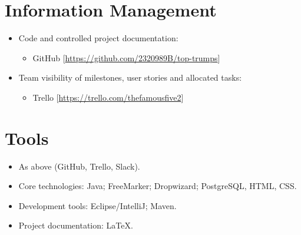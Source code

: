\documentclass[a4paper, 12pt, titlepage]{article}
\begin{document}
	\section{Information Management}
	\begin{itemize}
		\item Code and controlled project documentation:
		\begin{itemize}
			\item GitHub [\url{https://github.com/2320989B/top-trumps}]
		\end{itemize}

		\item Team visibility of milestones, user stories and allocated tasks:
		\begin{itemize}
			\item Trello [\url{https://trello.com/thefamousfive2}]
		\end{itemize}
	\end{itemize}


	\section{Tools}
	\begin{itemize}
		\item As above (GitHub, Trello, Slack).
		\item Core technologies: Java; FreeMarker; Dropwizard; PostgreSQL, HTML, CSS.
		\item Development tools: Eclipse/IntelliJ; Maven.
		\item Project documentation: LaTeX.
	\end{itemize}
\end{document}
